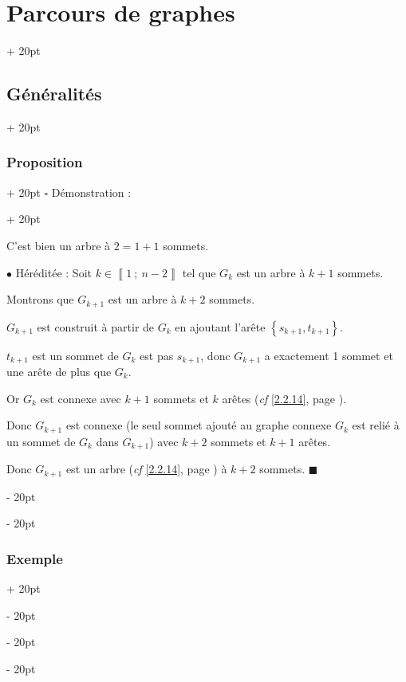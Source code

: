 \documentclass[a4paper, 12pt, twoside]{article}
\newcommand{\nset}[2]{\left\llbracket #1\ ;\ #2 \right\rrbracket}
\newcommand{\set}[1]{\left\{ #1 \right\}}
\newcommand{\ind}[1][20pt]{\advance\leftskip + #1}
\newcommand{\deind}[1][20pt]{\advance\leftskip - #1}
\newenvironment{indt}[2][20pt]{#2 \par \ind[#1]}{\par \deind} %
\begin{document}
\begin{indt}{\section{Parcours de graphes}}
\begin{indt}{\subsection{Généralités}}
\begin{indt}{\subsubsection{Proposition}}
\begin{indt}{$\square$ Démonstration :}
\begin{center}
                    \end{center}

                    C'est bien un arbre à $2 = 1 + 1$ sommets.

                    \vspace{6pt}
                    
                    $\bullet$ Héréditée : Soit $k \in \nset 1 {n - 2}$ tel que $G_k$ est un arbre à $k + 1$ sommets.

                    Montrons que $G_{k + 1}$ est un arbre à $k + 2$ sommets.

                    $G_{k + 1}$ est construit à partir de $G_k$ en ajoutant l'arête $\set{s_{k + 1}, t_{k + 1}}$.

                    $t_{k + 1}$ est un sommet de $G_k$ est pas $s_{k + 1}$, donc $G_{k + 1}$ a exactement 1 sommet et une arête de plus que $G_k$.

                    Or $G_k$ est connexe avec $k + 1$ sommets et $k$ arêtes (\textit{cf} \ref{2.2.14}, page \pageref{2.2.14}).

                    Donc $G_{k + 1}$ est connexe (le seul sommet ajouté au graphe connexe $G_k$ est relié à un sommet de $G_k$ dans $G_{k + 1}$) avec $k + 2$ sommets et $k + 1$ arêtes.

                    Donc $G_{k + 1}$ est un arbre (\textit{cf} \ref{2.2.14}, page \pageref{2.2.14}) à $k + 2$ sommets. $\blacksquare$
                \end{indt}
            \end{indt}

            \vspace{12pt}
            
            \begin{indt}{\subsubsection{Exemple}}
                \begin{center}
\end{center}
\end{indt}
\end{indt}
\end{indt}
\end{document}
